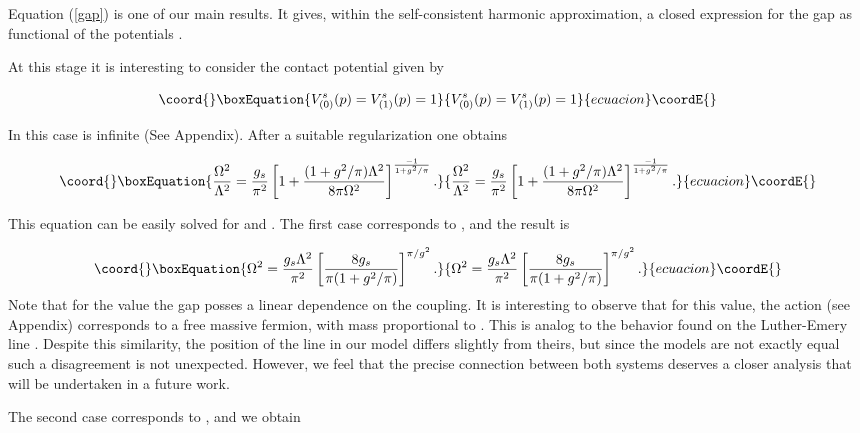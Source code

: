 \documentclass[a4paper,a4paper]{article}
\begin{document}
Equation (\ref{gap}) is one of our main results. It gives, within the self-consistent
harmonic approximation, a closed expression for the gap as functional of the
potentials \coordHE{}.

At this stage it is interesting to consider the contact potential given by

\begin{equation}\coord{}\boxEquation{
V^s_{(0)}(p)=V^s_{(1)}(p)=1
}{
V^s_{(0)}(p)=V^s_{(1)}(p)=1
}{ecuacion}\coordE{}\end{equation}

 In this case \coordHE{} is infinite (See Appendix). After a suitable regularization one
obtains

\begin{equation}\coord{}\boxEquation{
\frac{\Omega^2}{\Lambda^2}=\frac{g_s}{\pi^2}
\left[1+\frac{(1+g^2/\pi)\Lambda^2}{8\pi\Omega^2}\right]^{\frac{-1}{1+g^2/\pi}}.
}{
\frac{\Omega^2}{\Lambda^2}=\frac{g_s}{\pi^2}
\left[1+\frac{(1+g^2/\pi)\Lambda^2}{8\pi\Omega^2}\right]^{\frac{-1}{1+g^2/\pi}}.
}{ecuacion}\coordE{}\end{equation}

\noindent This equation can be easily solved for \myHighlight{$\Lambda\gg\Omega$}\coordHE{} and
\myHighlight{$\Omega\gg\Lambda$}\coordHE{}. The first case corresponds to \coordHE{}, and the result is

\begin{equation}\coord{}\boxEquation{
\Omega^2=\frac{g_s\Lambda^2}{\pi^2}
\left[\frac{8g_s}{\pi(1+g^2/\pi)}\right]^{\pi/g^2}.
}{
\Omega^2=\frac{g_s\Lambda^2}{\pi^2}
\left[\frac{8g_s}{\pi(1+g^2/\pi)}\right]^{\pi/g^2}.
}{ecuacion}\coordE{}\end{equation}
Note that for the value \coordHE{} the gap posses a linear dependence on the coupling.
It is interesting to observe that for this value, the action \coordHE{} (see Appendix)
corresponds to a free massive fermion, with mass proportional to \coordHE{}. This is analog
to the behavior found on the Luther-Emery line \cite{Luther-Emery}. Despite this
similarity, the position of the line in our model differs slightly from theirs, but
since the models are not exactly equal such a disagreement is not unexpected. However,
we feel that the precise connection between both systems deserves a closer analysis
that will be undertaken in a future work.

The second case corresponds to \coordHE{}, and we obtain
\end{document}
